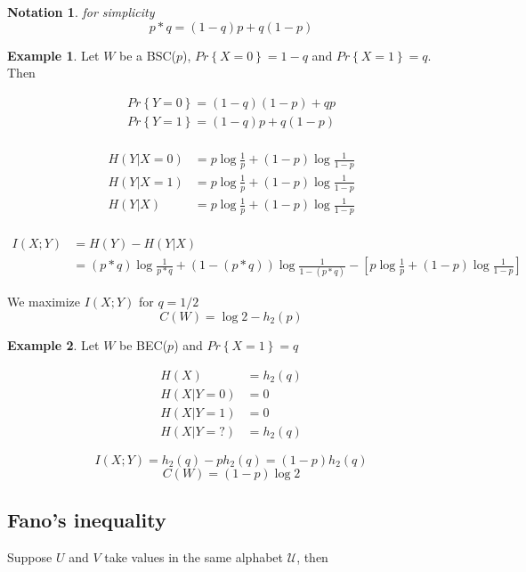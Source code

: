 \documentclass{article}
\newtheorem{notation}{Notation}
\theoremstyle{definition} %
\newtheorem{example}{Example}
\renewcommand{\Pr}[1]{Pr\left\{#1\right\}}
\def\U{\mathcal{U}}
\begin{document}
\begin{notation} for simplicity
  \[
    p\ast q = (1-q)p + q(1-p)
  \]
\end{notation}

\begin{example}
  Let $W$ be a BSC($p$), $\Pr{X=0} = 1 - q$ and $\Pr{X=1} = q$. Then

  \begin{align*}
    \Pr{Y=0} = (1-q)(1-p) + qp\\
    \Pr{Y=1} = (1-q)p + q(1-p)\\
  \end{align*}

  \begin{align*}
    H(Y|X=0) &= p \log \frac 1 p + (1-p) \log \frac 1 {1-p}\\
    H(Y|X=1) &= p \log \frac 1 p + (1-p) \log \frac 1 {1-p}\\
    H(Y|X) &= p \log \frac 1 p + (1-p) \log \frac 1 {1-p}\\
  \end{align*}

  \begin{align*}
    I(X;Y) &= H(Y) - H(Y|X)\\
    &=(p\ast q) \log \frac 1 {p\ast q} + (1-(p\ast q))\log \frac 1 {1-(p\ast q)}
    -
    \left[
    p \log \frac 1 p + (1-p) \log \frac 1 {1-p}
    \right]
  \end{align*}

  We maximize $I(X;Y)$ for $q=1/2$
  \[
    C(W) = \log 2 - h_2(p)
  \]

\end{example}

\begin{example}
  Let $W$ be BEC($p$) and $\Pr{X=1} = q$

  \begin{align*}
    H(X) &= h_2(q)
\\    H(X|Y=0) &= 0\\
    H(X|Y=1) &= 0\\
    H(X|Y=?) &= h_2(q)
  \end{align*}

  \[
    I(X;Y) = h_2(q) - ph_2(q) = (1-p)h_2(q)
  \]
  \[
    C(W) = (1-p)\log 2
  \]
\end{example}


\subsection{Fano's inequality}
Suppose $U$ and $V$ take values in the same alphabet $\U$, then
\end{document}
